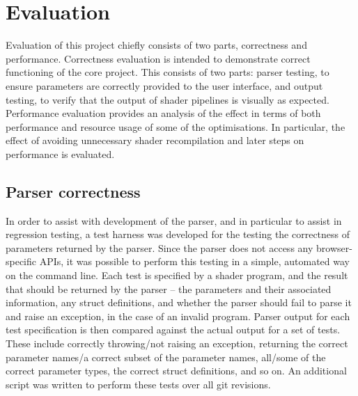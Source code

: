 \documentclass[12pt,twoside,notitlepage]{report}
\begin{document}
\chapter{Evaluation}
Evaluation of this project chiefly consists of two parts, correctness and performance. Correctness evaluation is intended to demonstrate correct functioning of the core project. This consists of two parts: parser testing, to ensure parameters are correctly provided to the user interface, and output testing, to verify that the output of shader pipelines is visually as expected. Performance evaluation provides an analysis of the effect in terms of both performance and resource usage of some of the optimisations. In particular, the effect of avoiding unnecessary shader recompilation and later steps on performance is evaluated.

\section{Parser correctness}
In order to assist with development of the parser, and in particular to assist in regression testing, a test harness was developed for the testing the correctness of parameters returned by the parser. Since the parser does not access any browser-specific APIs, it was possible to perform this testing in a simple, automated way on the command line. Each test is specified by a shader program, and the result that should be returned by the parser -- the parameters and their associated information, any struct definitions, and whether the parser should fail to parse it and raise an exception, in the case of an invalid program. Parser output for each test specification is then compared against the actual output for a set of tests. These include correctly throwing/not raising an exception, returning the correct parameter names/a correct subset of the parameter names, all/some of the correct parameter types, the correct struct definitions, and so on. An additional script was written to perform these tests over all git revisions. 
\end{document}
